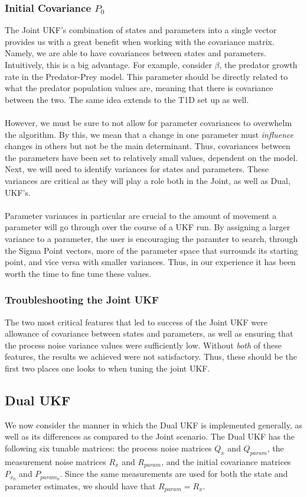\subsubsection{Initial Covariance $P_0$}
The Joint UKF's combination of states and parameters into a single vector provides us with a great benefit when working with the covariance matrix. Namely, we are able to have covariances between states and parameters. Intuitively, this is a big advantage. For example, consider $\beta$, the predator growth rate in the Predator-Prey model. This parameter should be directly related to what the predator population values are, meaning that there is covariance between the two. The same idea extends to the T1D set up as well.\\
\\
However, we must be sure to not allow for parameter covariances to overwhelm the algorithm. By this, we mean that a change in one parameter must \emph{influence} changes in others but not be the main determinant. Thus, covariances between the parameters have been set to relatively small values, dependent on the model. Next, we will need to identify variances for states and parameters. These variances are critical as they will play a role both in the Joint, as well as Dual, UKF's.\\
\\
Parameter variances in particular are crucial to the amount of movement a parameter will go through over the course of a UKF run. By assigning a larger variance to a parameter, the user is encouraging the paramter to search, through the Sigma Point vectors, more of the parameter space that surrounds its starting point, and vice versa with smaller variances. Thus, in our experience it has been worth the time to fine tune these values.


\subsubsection{Troubleshooting the Joint UKF}
The two most critical features that led to success of the Joint UKF were allowance of covariance between states and parameters, as well as ensuring that the process noise variance values were sufficiently low. Without \emph{both} of these features, the results we achieved were not satisfactory. Thus, these should be the first two places one looks to when tuning the joint UKF.




\subsection{Dual UKF}
We now consider the manner in which the Dual UKF is implemented generally, as well as its differences as compared to the Joint scenario. The Dual UKF has the following six tunable matrices: the process noise matrices $Q_x$ and $Q_{param}$, the measurement noise matrices $R_x$ and $R_{param}$, and the initial covariance matrices $P_{x_0}$ and $P_{param_0}$. Since the same measurements are used for both the state and parameter estimates, we should have that $R_{param} = R_x$.\\


